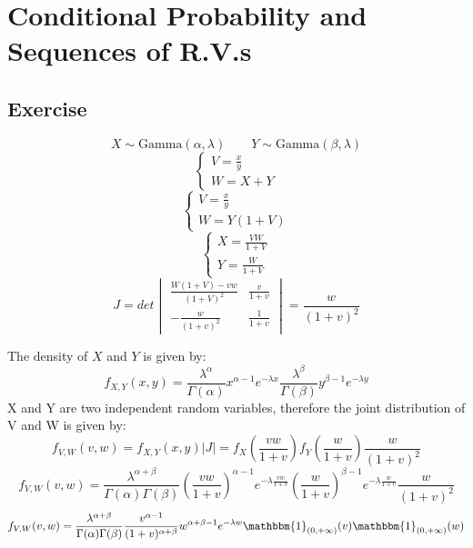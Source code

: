 \chapter{Conditional Probability and Sequences of R.V.s}
\vspace{-1.5cm}

{\chaptoc\noindent\begin{minipage}[inner sep=0,outer sep=0]{0.9\linewidth}\section{Exercise}\end{minipage}}

\[
X \sim \text{Gamma}(\alpha, \lambda) \qquad Y \sim \text{Gamma}(\beta, \lambda)
\]
\[
\begin{cases}
    V = \frac{x}{y} \\
    W = X + Y
\end{cases}
\]
\[
        \begin{cases}
            V = \frac{x}{y} \\
            W = Y(1+V)
        \end{cases}
\]
\[
    \begin{cases}
        X = \frac{VW}{1+V} \\
        Y = \frac{W}{1+V}
    \end{cases}
\]
\[
        J = det \begin{vmatrix}
            \frac{W(1+V)-vw}{(1+V)^2} & \frac{v}{1+v} \\
            -\frac{w}{(1+v)^2} & \frac{1}{1+v}
        \end{vmatrix} = \frac{w}{(1+v)^2}
\]

The density of $X$ and $Y$ is given by:
\[
f_{X, Y}(x, y) = \frac{\lambda^\alpha}{\Gamma(\alpha)} x^{\alpha-1} e^{-\lambda x} \frac{\lambda^\beta}{\Gamma(\beta)} y^{\beta-1} e^{-\lambda y} 
\]
X and Y are two independent random variables, therefore the joint distribution of V and W is given by:
\[
f_{V, W}(v, w) = f_{X, Y}(x, y) \left|J\right| = f_X\left(\frac{vw}{1+v}\right) f_Y\left(\frac{w}{1+v}\right) \frac{w}{(1+v)^2}
\]
\[
f_{V, W}(v, w) = \frac{\lambda^{\alpha+\beta}}{\Gamma(\alpha)\Gamma(\beta)} (\frac{vw}{1+v})^{\alpha-1} e^{-\lambda \frac{vw}{1+v}} (\frac{w}{1+v})^{\beta-1} e^{-\lambda \frac{w}{1+v}} \frac{w}{(1+v)^2}
\]
\[
f_{V, W}(v, w) = \frac{\lambda^{\alpha+\beta}}{\Gamma(\alpha)\Gamma(\beta)} \frac{v^{\alpha-1}}{(1+v)^{\alpha + \beta}} w^{\alpha + \beta-1} e^{-\lambda w} \mathbbm{1}_{(0, +\infty)}(v) \mathbbm{1}_{(0, +\infty)}(w)
\]

